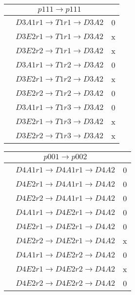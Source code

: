 \documentclass[10pt]{article}
\begin{document}
\begin{table}[!htbp]
\begin{minipage}{0.33\textwidth}
\begin{tabular}{cc c}
\hline

 &$p111 \rightarrow p111 $& \\ \hline
 & $D3A1 r1 \rightarrow T1 r1 \rightarrow D3A2$ & 0\\
 & $D3E2 r1 \rightarrow T1 r1 \rightarrow D3A2$ &  x\\
 & $D3E2 r2 \rightarrow T1 r1 \rightarrow D3A2$ &  x\\
 & $D3A1 r1 \rightarrow T1 r2 \rightarrow D3A2$ &  0\\
 & $D3E2 r1 \rightarrow T1 r2 \rightarrow D3A2$ &  x\\
 & $D3E2 r2 \rightarrow T1 r2 \rightarrow D3A2$ &  0\\
 & $D3A1 r1 \rightarrow T1 r3 \rightarrow D3A2$ &  0\\
 & $D3E2 r1 \rightarrow T1 r3 \rightarrow D3A2$ &  x\\
 & $D3E2 r2 \rightarrow T1 r3 \rightarrow D3A2$ &  x\\

 
\end{tabular}
\end{minipage}
\begin{minipage}[!htbp]{0.33\textwidth}
\centering
\begin{tabular}{ccc}

 &$p001 \rightarrow p002 $& \\ \hline
 & $D4A1 r1 \rightarrow D4A1 r1 \rightarrow D4A2$ & 0\\
 & $D4E2 r1 \rightarrow D4A1 r1 \rightarrow D4A2$ &  0\\
 & $D4E2 r2 \rightarrow D4A1 r1 \rightarrow D4A2$ &  0\\
 & $D4A1 r1 \rightarrow D4E2 r1 \rightarrow D4A2$ &  0\\
 & $D4E2 r1 \rightarrow D4E2 r1 \rightarrow D4A2$ &  0\\
 & $D4E2 r2 \rightarrow D4E2 r1 \rightarrow D4A2$ &  x\\
 & $D4A1 r1 \rightarrow D4E2 r2 \rightarrow D4A2$ &  0\\
 & $D4E2 r1 \rightarrow D4E2 r2 \rightarrow D4A2$ &  x\\
 & $D4E2 r2 \rightarrow D4E2 r2 \rightarrow D4A2$ &  0\\

\hline


\end{tabular}
\end{minipage}
\end{table}
\end{document}
